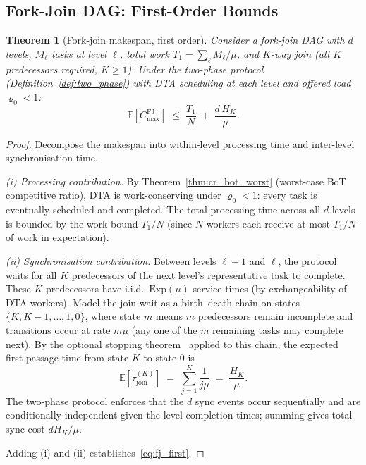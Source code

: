 \documentclass[11pt,a4paper]{article}
\newtheorem{theorem}{Theorem}[section]
\begin{document}
\subsection{Fork-Join DAG: First-Order Bounds}

\begin{theorem}[Fork-join makespan, first order]\label{thm:fj_first}
Consider a fork-join DAG with $d$ levels, $M_\ell$ tasks at level $\ell$,
total work $T_1 = \sum_\ell M_\ell/\mu$, and $K$-way join
(all $K$ predecessors required, $K \geq 1$).
Under the two-phase protocol (Definition~\ref{def:two_phase})
with DTA scheduling at each level and offered load $\varrho_0 < 1$:
\begin{equation}\label{eq:fj_first}
  \mathbb{E}[C_{\max}^{\mathrm{FJ}}]
  \;\leq\;
  \frac{T_1}{N}
  \;+\;
  \frac{d\,H_K}{\mu}.
\end{equation}
\end{theorem}

\begin{proof}
Decompose the makespan into within-level processing time and inter-level
synchronisation time.

\smallskip\noindent
\emph{(i) Processing contribution.}
By Theorem~\ref{thm:cr_bot_worst} (worst-case BoT competitive ratio),
DTA is work-conserving under $\varrho_0 < 1$: every task is eventually
scheduled and completed.
The total processing time across all $d$ levels is bounded by the work
bound $T_1/N$ (since $N$ workers each receive at most $T_1/N$ of work in
expectation).

\smallskip\noindent
\emph{(ii) Synchronisation contribution.}
Between levels $\ell{-}1$ and $\ell$, the protocol waits for all $K$
predecessors of the next level's representative task to complete.
These $K$ predecessors have i.i.d.\ $\mathrm{Exp}(\mu)$ service times
(by exchangeability of DTA workers).
Model the join wait as a birth--death chain on states
$\{K, K-1, \ldots, 1, 0\}$, where state $m$ means $m$ predecessors
remain incomplete and transitions occur at rate $m\mu$ (any one of the $m$
remaining tasks may complete next).
By the optional stopping theorem~\cite{norris1997} applied to this
chain, the expected first-passage time from state $K$ to state $0$ is
\[
  \mathbb{E}[\tau_{\mathrm{join}}^{(K)}]
  \;=\; \sum_{j=1}^K \frac{1}{j\mu}
  \;=\; \frac{H_K}{\mu}.
\]
The two-phase protocol enforces that the $d$ sync events occur
sequentially and are conditionally independent given the level-completion
times; summing gives total sync cost $d H_K/\mu$.

\smallskip\noindent
Adding (i) and (ii) establishes~\eqref{eq:fj_first}.
\end{proof}
\end{document}
